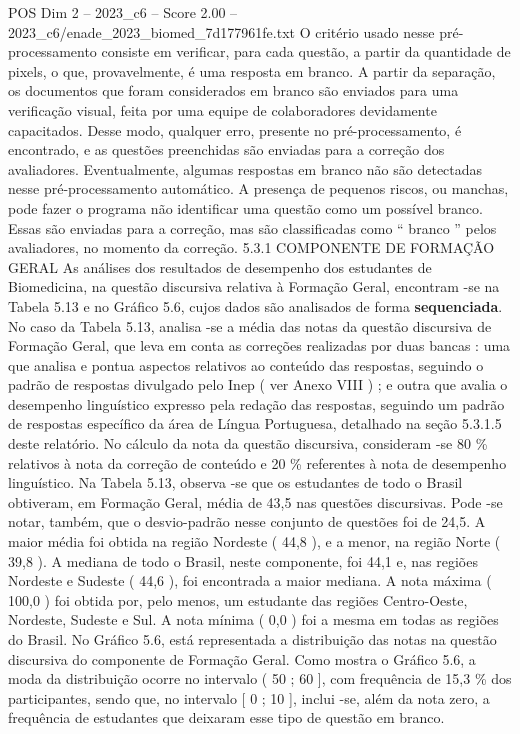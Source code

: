 \begin{textsample}{POS Dim 2 – 2023\_c6 – Score 2.00 – 2023\_c6/enade\_2023\_biomed\_7d177961fe.txt}
O critério usado nesse pré-processamento consiste em verificar, para cada questão, a partir da quantidade de pixels, o que, provavelmente, é uma resposta em branco.
A partir da separação, os documentos que foram considerados em branco são enviados para uma verificação visual, feita por uma equipe de colaboradores devidamente capacitados.
Desse modo, qualquer erro, presente no pré-processamento, é encontrado, e as questões preenchidas são enviadas para a correção dos avaliadores.
Eventualmente, algumas respostas em branco não são detectadas nesse pré-processamento automático.
A presença de pequenos riscos, ou manchas, pode fazer o programa não identificar uma questão como um possível branco.
Essas são enviadas para a correção, mas são classificadas como “ branco ” pelos avaliadores, no momento da correção. 5.3.1 COMPONENTE DE FORMAÇÃO GERAL As análises dos resultados de desempenho dos estudantes de Biomedicina, na questão discursiva relativa à Formação Geral, encontram -se na Tabela 5.13 e no Gráfico 5.6, cujos dados são analisados de forma \textbf{sequenciada}.
No caso da Tabela 5.13, analisa -se a média das notas da questão discursiva de Formação Geral, que leva em conta as correções realizadas por duas bancas : uma que analisa e pontua aspectos relativos ao conteúdo das respostas, seguindo o padrão de respostas divulgado pelo Inep ( ver Anexo VIII ) ; e outra que avalia o desempenho linguístico expresso pela redação das respostas, seguindo um padrão de respostas específico da área de Língua Portuguesa, detalhado na seção 5.3.1.5 deste relatório.
No cálculo da nota da questão discursiva, consideram -se 80 \% relativos à nota da correção de conteúdo e 20 \% referentes à nota de desempenho linguístico.
Na Tabela 5.13, observa -se que os estudantes de todo o Brasil obtiveram, em Formação Geral, média de 43,5 nas questões discursivas.
Pode -se notar, também, que o desvio-padrão nesse conjunto de questões foi de 24,5.
A maior média foi obtida na região Nordeste ( 44,8 ), e a menor, na região Norte ( 39,8 ).
A mediana de todo o Brasil, neste componente, foi 44,1 e, nas regiões Nordeste e Sudeste ( 44,6 ), foi encontrada a maior mediana.
A nota máxima ( 100,0 ) foi obtida por, pelo menos, um estudante das regiões Centro-Oeste, Nordeste, Sudeste e Sul.
A nota mínima ( 0,0 ) foi a mesma em todas as regiões do Brasil.
No Gráfico 5.6, está representada a distribuição das notas na questão discursiva do componente de Formação Geral.
Como mostra o Gráfico 5.6, a moda da distribuição ocorre no intervalo ( 50 ; 60 ], com frequência de 15,3 \% dos participantes, sendo que, no intervalo [ 0 ; 10 ], inclui -se, além da nota zero, a frequência de estudantes que deixaram esse tipo de questão em branco.

\end{textsample}
